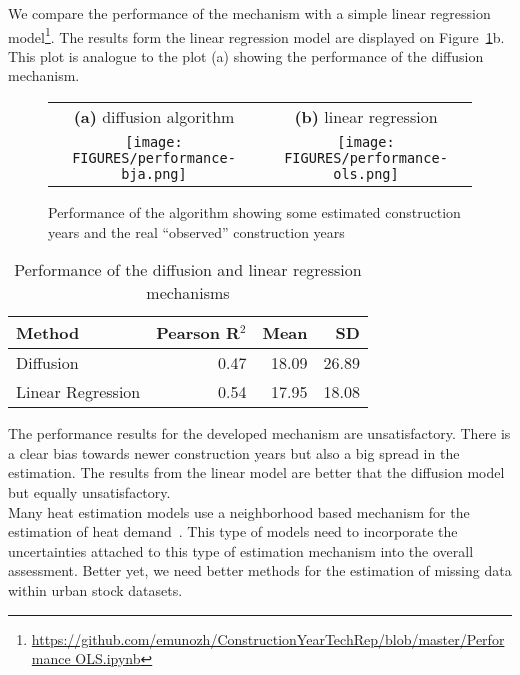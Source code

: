 We compare the performance of the mechanism with a simple linear regression
model\footnote{\url{https://github.com/emunozh/ConstructionYearTechRep/blob/master/Performance OLS.ipynb}}.
The results form the linear regression model are displayed on
Figure~\ref{fig:performance}b. This plot is analogue to the plot (a) showing
the performance of the diffusion mechanism.\\

\begin{figure}[htpb]
    \centering
    \begin{tabular}{cc}
        \textbf{(a)} diffusion algorithm&
        \textbf{(b)} linear regression\\
    \texttt{[image: FIGURES/performance-bja.png]}&
    \texttt{[image: FIGURES/performance-ols.png]}\\
    \end{tabular}
    \caption{Performance of the algorithm showing some estimated construction
        years and the real ``observed'' construction years
}\label{fig:performance}
\end{figure}

\begin{table}[htb]
    \centering
    \caption{Performance of the diffusion and linear regression
    mechanisms}\label{tab:performance}
    \begin{tabular}{lrrr}
        \toprule
        \textbf{Method} & \textbf{Pearson R$^2$} &
        \textbf{Mean} & \textbf{SD}\\
        \midrule
        Diffusion           & 0.47 & 18.09 & 26.89\\
        Linear Regression   & 0.54 & 17.95 & 18.08\\
        \bottomrule
    \end{tabular}
\end{table}

The performance results for the developed mechanism are unsatisfactory. There
is a clear bias towards newer construction years but also a big spread in the
estimation. The results from the linear model are better that the diffusion
model but equally unsatisfactory.\\

Many heat estimation models use a neighborhood based mechanism for the
estimation of heat
demand~\cite{Hermelink.2011,MunozH.2011.msc,MunozH.2014.IJM,MunozH.2015.MEQ}.
This type of models need to incorporate the uncertainties attached to this type
of estimation mechanism into the overall assessment. Better yet, we need better
methods for the estimation of missing data within urban stock datasets.\\

